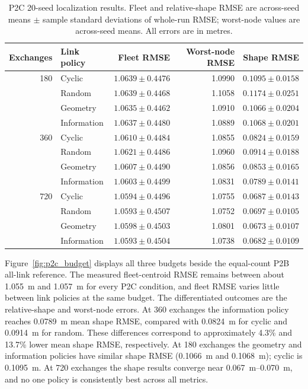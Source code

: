 \begin{table}[htbp]
    \centering
    \caption{P2C 20-seed localization results. Fleet and relative-shape RMSE are across-seed means \(\pm\) sample standard deviations of whole-run RMSE; worst-node values are across-seed means. All errors are in metres.}
    \label{tab:p2c_results}
    \begin{tabular}{rlrrr}
        \toprule
        Exchanges & Link policy & Fleet RMSE & Worst-node RMSE & Shape RMSE \\
        \midrule
        180 & Cyclic & \(1.0639\pm0.4476\) & 1.0990 & \(0.1095\pm0.0158\) \\
            & Random & \(1.0639\pm0.4468\) & 1.1058 & \(0.1174\pm0.0251\) \\
            & Geometry & \(1.0635\pm0.4462\) & 1.0910 & \(0.1066\pm0.0204\) \\
            & Information & \(1.0637\pm0.4480\) & 1.0889 & \(0.1068\pm0.0201\) \\
        \midrule
        360 & Cyclic & \(1.0610\pm0.4484\) & 1.0855 & \(0.0824\pm0.0159\) \\
            & Random & \(1.0621\pm0.4486\) & 1.0960 & \(0.0914\pm0.0188\) \\
            & Geometry & \(1.0607\pm0.4490\) & 1.0856 & \(0.0853\pm0.0165\) \\
            & Information & \(1.0603\pm0.4499\) & 1.0831 & \(0.0789\pm0.0141\) \\
        \midrule
        720 & Cyclic & \(1.0594\pm0.4496\) & 1.0755 & \(0.0687\pm0.0143\) \\
            & Random & \(1.0593\pm0.4507\) & 1.0752 & \(0.0697\pm0.0105\) \\
            & Geometry & \(1.0598\pm0.4503\) & 1.0801 & \(0.0673\pm0.0107\) \\
            & Information & \(1.0593\pm0.4504\) & 1.0738 & \(0.0682\pm0.0109\) \\
        \bottomrule
    \end{tabular}
\end{table}

Figure~\ref{fig:p2c_budget} displays all three budgets beside the equal-count P2B all-link reference. The measured fleet-centroid RMSE remains between about \SI{1.055}{m} and \SI{1.057}{m} for every P2C condition, and fleet RMSE varies little between link policies at the same budget. The differentiated outcomes are the relative-shape and worst-node errors. At 360 exchanges the information policy reaches \SI{0.0789}{m} mean shape RMSE, compared with \SI{0.0824}{m} for cyclic and \SI{0.0914}{m} for random. These differences correspond to approximately 4.3\% and 13.7\% lower mean shape RMSE, respectively. At 180 exchanges the geometry and information policies have similar shape RMSE (\SI{0.1066}{m} and \SI{0.1068}{m}); cyclic is \SI{0.1095}{m}. At 720 exchanges the shape results converge near \SI{0.067}{m}--\SI{0.070}{m}, and no one policy is consistently best across all metrics.

